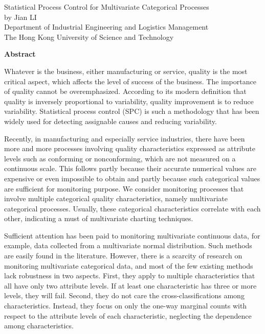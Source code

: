 \newpage
\begin{center}
{\Large Statistical Process Control for Multivariate Categorical Processes}\\
\vspace{10mm}
by Jian LI\\
\vspace{15mm}
Department of Industrial Engineering and Logistics Management\\
\vspace{10mm}
The Hong Kong University of Science and Technology
\end{center}
\vspace{12mm}
\begin{center}
\textbf{Abstract}
\end{center}
\par
\noindent

Whatever is the business, either manufacturing or service, quality is the most
critical aspect, which affects the level of success of the business. The importance
of quality cannot be overemphasized. According to its modern definition that quality
is inversely proportional to variability, quality improvement is to reduce
variability. Statistical process control (SPC) is such a methodology that has been
widely used for detecting assignable causes and reducing variability.

Recently, in manufacturing and especially service industries, there have been more
and more processes involving quality characteristics expressed as attribute levels
such as conforming or nonconforming, which are not measured on a continuous scale.
This follows partly because their accurate numerical values are expensive or even
impossible to obtain and partly because such categorical values are sufficient for
monitoring purpose. We consider monitoring processes that involve multiple
categorical quality characteristics, namely multivariate categorical processes.
Usually, these categorical characteristics correlate with each other, indicating a
must of multivariate charting techniques.

Sufficient attention has been paid to monitoring multivariate continuous data, for
example, data collected from a multivariate normal distribution. Such methods are
easily found in the literature. However, there is a scarcity of research on
monitoring multivariate categorical data, and most of the few existing methods lack
robustness in two aspects. First, they apply to multiple characteristics that all
have only two attribute levels. If at least one characteristic has three or more
levels, they will fail. Second, they do not care the cross-classifications among
characteristics. Instead, they focus on only the one-way marginal counts with
respect to the attribute levels of each characteristic, neglecting the dependence
among characteristics.

